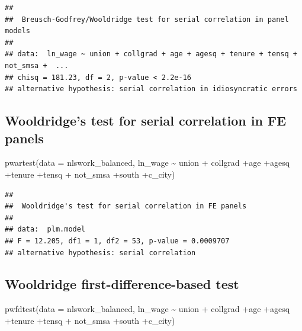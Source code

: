 \documentclass[
]{article}
\newenvironment{Shaded}{\begin{snugshade}}{\end{snugshade}}
\newcommand{\AttributeTok}[1]{\textcolor[rgb]{0.77,0.63,0.00}{#1}}
\newcommand{\FunctionTok}[1]{\textcolor[rgb]{0.00,0.00,0.00}{#1}}
\newcommand{\NormalTok}[1]{#1}
\newcommand{\SpecialCharTok}[1]{\textcolor[rgb]{0.00,0.00,0.00}{#1}}
\begin{document}
\begin{verbatim}
## 
##  Breusch-Godfrey/Wooldridge test for serial correlation in panel models
## 
## data:  ln_wage ~ union + collgrad + age + agesq + tenure + tensq + not_smsa +  ...
## chisq = 181.23, df = 2, p-value < 2.2e-16
## alternative hypothesis: serial correlation in idiosyncratic errors
\end{verbatim}

\hypertarget{wooldridges-test-for-serial-correlation-in-fe-panels}{%
\subsection{Wooldridge's test for serial correlation in FE
panels}\label{wooldridges-test-for-serial-correlation-in-fe-panels}}

\begin{Shaded}
\begin{Highlighting}[]
  \FunctionTok{pwartest}\NormalTok{(}\AttributeTok{data =}\NormalTok{ nlswork\_balanced, ln\_wage }\SpecialCharTok{\textasciitilde{}}\NormalTok{ union }\SpecialCharTok{+}
\NormalTok{             collgrad }\SpecialCharTok{+}\NormalTok{age }\SpecialCharTok{+}\NormalTok{agesq }\SpecialCharTok{+}\NormalTok{tenure }\SpecialCharTok{+}\NormalTok{tensq }\SpecialCharTok{+}
\NormalTok{             not\_smsa }\SpecialCharTok{+}\NormalTok{south }\SpecialCharTok{+}\NormalTok{c\_city)}
\end{Highlighting}
\end{Shaded}

\begin{verbatim}
## 
##  Wooldridge's test for serial correlation in FE panels
## 
## data:  plm.model
## F = 12.205, df1 = 1, df2 = 53, p-value = 0.0009707
## alternative hypothesis: serial correlation
\end{verbatim}

\hypertarget{wooldridge-first-difference-based-test}{%
\subsection{Wooldridge first-difference-based
test}\label{wooldridge-first-difference-based-test}}

\begin{Shaded}
\begin{Highlighting}[]
  \FunctionTok{pwfdtest}\NormalTok{(}\AttributeTok{data =}\NormalTok{ nlswork\_balanced, ln\_wage }\SpecialCharTok{\textasciitilde{}}\NormalTok{ union }\SpecialCharTok{+}
\NormalTok{             collgrad }\SpecialCharTok{+}\NormalTok{age }\SpecialCharTok{+}\NormalTok{agesq }\SpecialCharTok{+}\NormalTok{tenure }\SpecialCharTok{+}\NormalTok{tensq }\SpecialCharTok{+}
\NormalTok{             not\_smsa }\SpecialCharTok{+}\NormalTok{south }\SpecialCharTok{+}\NormalTok{c\_city)}
\end{Highlighting}
\end{Shaded}
\end{document}
